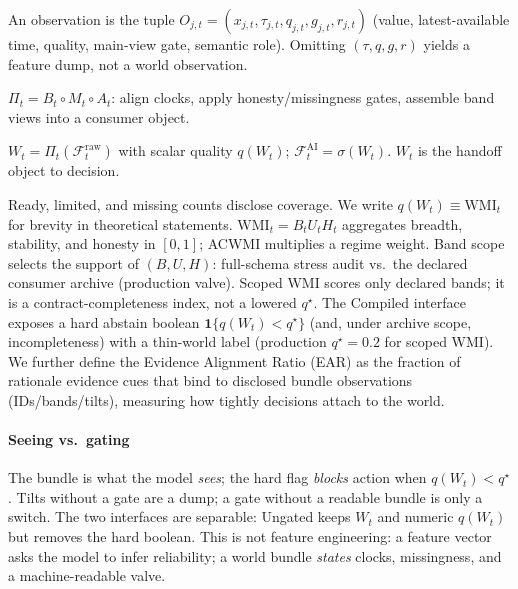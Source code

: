 \documentclass[sigconf,anonymous]{acmart}
\theoremstyle{acmdefinition}%
\theoremstyle{acmplain}%
\begin{document}
\begin{definition}
An observation is the tuple
\(O_{j,t}=(x_{j,t},\tau_{j,t},q_{j,t},g_{j,t},r_{j,t})\)
(value, latest-available time, quality, main-view gate, semantic role).
Omitting \((\tau,q,g,r)\) yields a feature dump, not a world observation.
\end{definition}

\begin{definition}[Compilation]
\(\Pi_t=B_t\circ M_t\circ A_t\): align clocks, apply honesty/missingness gates, assemble band views into a consumer object.
\end{definition}

\begin{definition}
\(W_t=\Pi_t(\mathcal{F}^{\mathrm{raw}}_t)\) with scalar quality \(q(W_t)\);
\(\mathcal{F}^{\mathrm{AI}}_t=\sigma(W_t)\).
\(W_t\) is the handoff object to decision.
\end{definition}

\begin{definition}
\label{def:wmi}
Ready, limited, and missing counts disclose coverage.
We write \(q(W_t)\equiv\mathrm{WMI}_t\) for brevity in theoretical statements.
\(\mathrm{WMI}_t=B_t U_t H_t\) aggregates breadth, stability, and honesty in \([0,1]\); ACWMI multiplies a regime weight.
Band scope selects the support of \((B,U,H)\): full-schema stress audit vs.\ the declared consumer archive (production valve).
Scoped WMI scores only declared bands; it is a contract-completeness index, not a lowered \(q^\star\).
The Compiled interface exposes a hard abstain boolean
\(\mathbf{1}\{q(W_t)<q^\star\}\) (and, under archive scope, incompleteness) with a thin-world label (production \(q^\star=0.2\) for scoped WMI).
We further define the Evidence Alignment Ratio (EAR) as the fraction of rationale evidence cues that bind to disclosed bundle observations (IDs/bands/tilts), measuring how tightly decisions attach to the world.
\end{definition}

\paragraph{Seeing vs.\ gating}
The bundle is what the model \emph{sees}; the hard flag \emph{blocks} action when \(q(W_t)<q^\star\).
Tilts without a gate are a dump; a gate without a readable bundle is only a switch.
The two interfaces are separable: Ungated keeps \(W_t\) and numeric \(q(W_t)\) but removes the hard boolean.
This is not feature engineering: a feature vector asks the model to infer reliability; a world bundle \emph{states} clocks, missingness, and a machine-readable valve.
\end{document}
